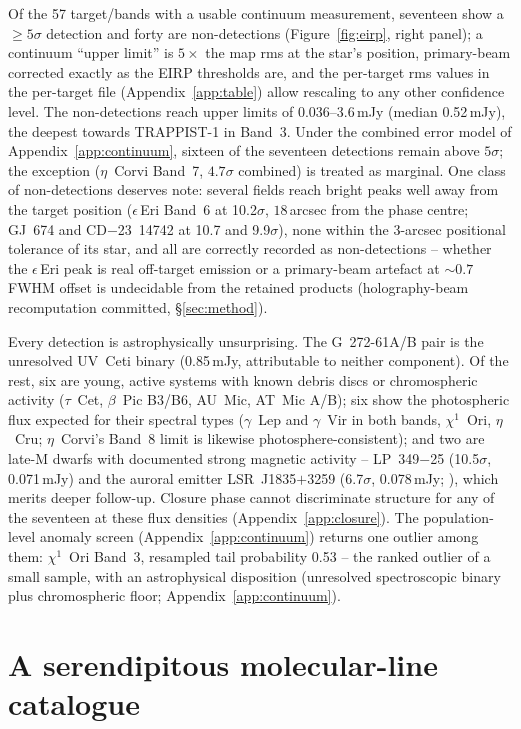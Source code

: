 \documentclass{openjournal}
\begin{document}
Of the 57 target/bands with a usable continuum measurement, seventeen
show a $\geq5\sigma$ detection and forty are non-detections
(Figure~\ref{fig:eirp}, right panel); a continuum ``upper limit'' is
$5\times$ the map rms at the star's position, primary-beam corrected
exactly as the EIRP thresholds are, and the per-target rms values in
the per-target file (Appendix~\ref{app:table}) allow rescaling to any other confidence level.
The non-detections reach upper limits of 0.036--3.6\,mJy (median
0.52\,mJy), the deepest towards TRAPPIST-1 in Band~3. Under the
combined error model of Appendix~\ref{app:continuum}, sixteen of the
seventeen detections remain above $5\sigma$; the exception
($\eta$~Corvi Band~7, $4.7\sigma$ combined) is treated as marginal.
One class of non-detections deserves note: several fields reach
bright peaks well away from the target position ($\epsilon$\,Eri
Band~6 at 10.2$\sigma$, $18$\,arcsec from the phase centre; GJ~674
and CD$-$23~14742 at 10.7 and 9.9$\sigma$), none within the
$3$-arcsec positional tolerance of its star, and all are correctly
recorded as non-detections -- whether the $\epsilon$\,Eri peak is
real off-target emission or a primary-beam artefact at ${\sim}0.7$
FWHM offset is undecidable from the retained products
(holography-beam recomputation committed, \S\ref{sec:method}).

Every detection is astrophysically unsurprising. The G~272-61A/B pair
is the unresolved UV~Ceti binary (0.85\,mJy, attributable to neither
component). Of the rest, six are young, active systems with known
debris discs or chromospheric activity ($\tau$~Cet, $\beta$~Pic
B3/B6, AU~Mic, AT~Mic A/B); six show the photospheric flux expected
for their spectral types ($\gamma$~Lep and $\gamma$~Vir in both
bands, $\chi^{1}$~Ori, $\eta$~Cru; $\eta$~Corvi's Band~8 limit is
likewise photosphere-consistent); and two are late-M dwarfs with
documented strong magnetic activity -- LP~349$-$25 (10.5$\sigma$,
0.071\,mJy) and the auroral emitter LSR~J1835$+$3259 (6.7$\sigma$,
0.078\,mJy; \citealt{Hallinan2007}), which merits deeper follow-up.
Closure phase cannot discriminate structure for any of the seventeen
at these flux densities (Appendix~\ref{app:closure}). The
population-level anomaly screen (Appendix~\ref{app:continuum}) returns one
outlier among them: $\chi^{1}$~Ori Band~3, resampled tail probability
0.53 -- the ranked outlier of a small sample, with an astrophysical
disposition (unresolved spectroscopic binary plus chromospheric
floor; Appendix~\ref{app:continuum}).

\section{A serendipitous molecular-line catalogue}
\label{app:linecat}
\end{document}
